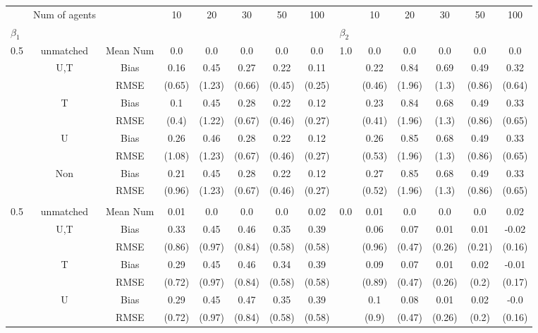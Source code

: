 \begin{tabular}{@{\extracolsep{5pt}}lc|cccccc|lccccc}
\toprule 
 & Num of agents &  & 10 & 20 & 30 & 50 & 100 &  & 10 & 20 & 30 & 50 & 100 \\
$\beta_1$ &  &  &  &  &  &  &  & $\beta_2$ &  &  &  &  &  \\
\midrule 
0.5 & unmatched & Mean Num & 0.0 & 0.0 & 0.0 & 0.0 & 0.0 & 1.0 & 0.0 & 0.0 & 0.0 & 0.0 & 0.0 \\
 & U,T & Bias & 0.16 & 0.45 & 0.27 & 0.22 & 0.11 &  & 0.22 & 0.84 & 0.69 & 0.49 & 0.32 \\
 &  & RMSE & (0.65) & (1.23) & (0.66) & (0.45) & (0.25) &  & (0.46) & (1.96) & (1.3) & (0.86) & (0.64) \\
 & T & Bias & 0.1 & 0.45 & 0.28 & 0.22 & 0.12 &  & 0.23 & 0.84 & 0.68 & 0.49 & 0.33 \\
 &  & RMSE & (0.4) & (1.22) & (0.67) & (0.46) & (0.27) &  & (0.41) & (1.96) & (1.3) & (0.86) & (0.65) \\
 & U & Bias & 0.26 & 0.46 & 0.28 & 0.22 & 0.12 &  & 0.26 & 0.85 & 0.68 & 0.49 & 0.33 \\
 &  & RMSE & (1.08) & (1.23) & (0.67) & (0.46) & (0.27) &  & (0.53) & (1.96) & (1.3) & (0.86) & (0.65) \\
 & Non & Bias & 0.21 & 0.45 & 0.28 & 0.22 & 0.12 &  & 0.27 & 0.85 & 0.68 & 0.49 & 0.33 \\
 &  & RMSE & (0.96) & (1.23) & (0.67) & (0.46) & (0.27) &  & (0.52) & (1.96) & (1.3) & (0.86) & (0.65) \\
 &  &  &  &  &  &  &  &  &  &  &  &  &  \\
0.5 & unmatched & Mean Num & 0.01 & 0.0 & 0.0 & 0.0 & 0.02 & 0.0 & 0.01 & 0.0 & 0.0 & 0.0 & 0.02 \\
 & U,T & Bias & 0.33 & 0.45 & 0.46 & 0.35 & 0.39 &  & 0.06 & 0.07 & 0.01 & 0.01 & -0.02 \\
 &  & RMSE & (0.86) & (0.97) & (0.84) & (0.58) & (0.58) &  & (0.96) & (0.47) & (0.26) & (0.21) & (0.16) \\
 & T & Bias & 0.29 & 0.45 & 0.46 & 0.34 & 0.39 &  & 0.09 & 0.07 & 0.01 & 0.02 & -0.01 \\
 &  & RMSE & (0.72) & (0.97) & (0.84) & (0.58) & (0.58) &  & (0.89) & (0.47) & (0.26) & (0.2) & (0.17) \\
 & U & Bias & 0.29 & 0.45 & 0.47 & 0.35 & 0.39 &  & 0.1 & 0.08 & 0.01 & 0.02 & -0.0 \\
 &  & RMSE & (0.72) & (0.97) & (0.84) & (0.58) & (0.58) &  & (0.9) & (0.47) & (0.26) & (0.2) & (0.16) \\

\end{tabular}
